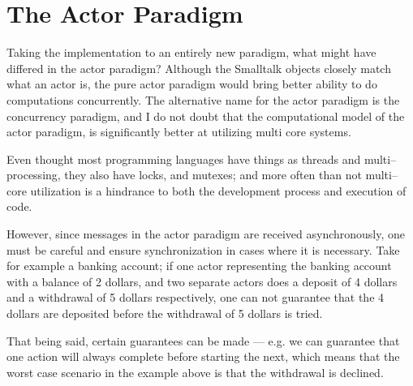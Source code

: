 \section{The Actor Paradigm}
Taking the implementation to an entirely new paradigm, what might have differed in the actor paradigm?
Although the Smalltalk objects closely match what an actor is, the pure actor paradigm would bring better ability to do computations concurrently.
The alternative name for the actor paradigm is the concurrency paradigm, and I do not doubt that the computational model of the actor paradigm, is significantly better at utilizing multi core systems.

Even thought most programming languages have things as threads and multi--processing, they also have locks, and mutexes;
and more often than not multi--core utilization is a hindrance to both the development process and execution of code.

However, since messages in the actor paradigm are received asynchronously, one must be careful and ensure synchronization in cases where it is necessary.
Take for example a banking account; if one actor representing the banking account with a balance of 2 dollars,
and two separate actors does a deposit of 4 dollars and a withdrawal of 5 dollars respectively,
one can not guarantee that the 4 dollars are deposited before the withdrawal of 5 dollars is tried.

That being said, certain guarantees can be made --- e.g. we can guarantee that one action will always complete before starting the next,
which means that the worst case scenario in the example above is that the withdrawal is declined.
